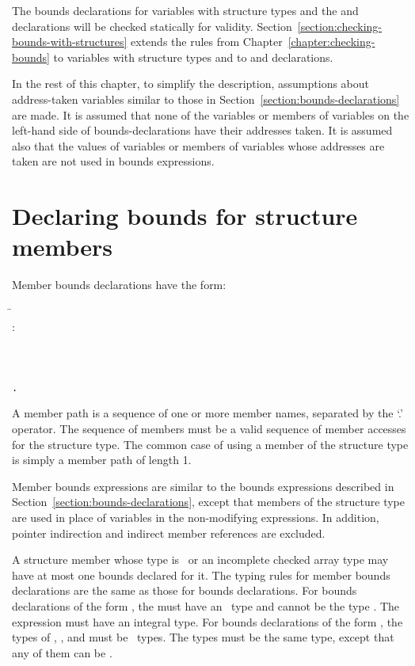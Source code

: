 The bounds declarations for variables with structure types and the
 and  declarations will be checked statically 
for validity.  Section~\ref{section:checking-bounds-with-structures} extends 
the rules  from Chapter~\ref{chapter:checking-bounds} to variables with structure
types and to  and  declarations.

In the rest of this chapter, to simplify the description, assumptions
about address-taken variables similar to those in
Section~\ref{section:bounds-declarations} are made.
It is assumed that none of the variables or members of variables on the
left-hand side of bounds-declarations have their addresses taken. It is
assumed also that the values of variables or members of variables whose
addresses are taken are not used in bounds expressions.

\section{Declaring bounds for structure members}

Member bounds declarations have the form:
\begin{tabbing}
\=\\
\>  :  \\
\\
\\
\>  \\
\>  \texttt{.} 
\end{tabbing}

A member path is a sequence of one or more member names, separated by
the `.' operator. The sequence of members must be a valid sequence of
member accesses for the structure type. The common case of using a
member of the structure type is simply a member path of length 1.

Member bounds expressions are similar to the bounds expressions
described in Section~\ref{section:bounds-declarations}, 
except that members of the structure type are
used in place of variables in the non-modifying expressions. In
addition, pointer indirection and indirect member references are
excluded.

A structure member whose type is \arrayptr\ or an incomplete
checked array type may have at most one bounds declared for it. The
typing rules for member bounds declarations are the same as those for
bounds declarations. For bounds declarations of the form
, the
 must have an \arrayptr\ type and cannot be the type
\arrayptrvoid. The expression
 must have an integral type. For bounds declarations of the
form , 
the types of , , and 
must be \arrayptr\ types. The types must be the same type,
except that any of them can be
\arrayptrvoid.


